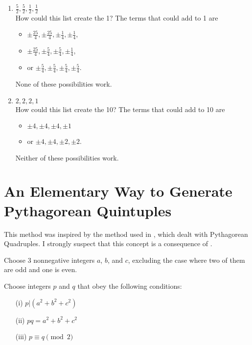 \documentclass[12pt,table]{article}
\theoremstyle{definition}
\theoremstyle{remark}
\numberwithin{equation}{section}
\begin{document}
\begin{appendices}
\begin{enumerate}
\item $ \frac{5}{2},\frac{5}{2}, \frac{1}{2}, \frac{1}{2}  $\\
How could this list create the 1?
The terms that could add to 1 are
\begin{itemize}
\item$ \pm\frac{25}{4},\pm\frac{25}{4}, \pm\frac{1}{4}, \pm\frac{1}{4}  $,
\item$ \pm\frac{25}{4},\pm\frac{5}{4}, \pm\frac{5}{4}, \pm\frac{1}{4}  $,
\item or $ \pm\frac{5}{4},\pm\frac{5}{4}, \pm\frac{5}{4}, \pm\frac{5}{4}  $. 
\end{itemize}
None of these possibilities work.

\item $2,2,2,1$\\
How could this list create the 10?
The terms that could add to 10 are
\begin{itemize}
\item$ \pm4,\pm4, \pm4, \pm1  $  
\item or $ \pm4,\pm4, \pm2, \pm2  $.
\end{itemize}
Neither of these possibilities work.


\end {enumerate}


\section{An Elementary Way to Generate Pythagorean Quintuples}
\label{appendix_B}

This method was inspired by the method used in \cite{Halai}, which 
dealt with Pythagorean Quadruples. I strongly suspect that this concept
is a consequence of \cite{Roy_and_Sonia}.


Choose 3 nonnegative integers $a$, $b$, and $c$, excluding the case 
where two of them are odd and one is even.





Choose integers $p$ and $q$ that obey the following 
conditions:


\begin{itemize}
\item[(i)]
$p|(a^2 + b^2 + c^2)$ 


\item[(ii)]
$pq = a^2 + b^2 + c^2$ 



\item[(iii)]
$p \equiv q \pmod 2$




\end{itemize}
\end{appendices}
\end{document}
